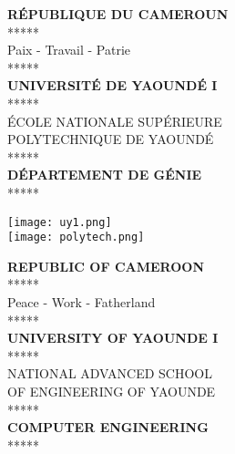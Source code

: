 \documentclass[12pt]{article}
\begin{document}
\thispagestyle{empty}

\begin{minipage}{0.3\linewidth}
    \begin{center}
        \textbf{RÉPUBLIQUE DU CAMEROUN}\\
        *****\\
        Paix - Travail - Patrie\\
        *****\\[0.3cm]

        \textbf{UNIVERSITÉ DE YAOUNDÉ I}\\
        *****\\[0.3cm]

        ÉCOLE NATIONALE SUPÉRIEURE\\
        POLYTECHNIQUE DE YAOUNDÉ\\
        *****\\[0.3cm]

        \textbf{DÉPARTEMENT DE GÉNIE}\\
        ***** 
    \end{center}
\end{minipage}
\begin{minipage}{0.35\linewidth}
    \begin{center}
        \texttt{[image: uy1.png]}\\[0.5cm]
        \texttt{[image: polytech.png]}
    \end{center}
\end{minipage}
\begin{minipage}{0.3\linewidth}
    \begin{center}
        \textbf{REPUBLIC OF CAMEROON}\\
        *****\\
        Peace - Work - Fatherland\\
        *****\\[0.3cm]

        \textbf{UNIVERSITY OF YAOUNDE I}\\
        *****\\[0.3cm]

        NATIONAL ADVANCED SCHOOL\\
        OF ENGINEERING OF YAOUNDE\\
        *****\\[0.3cm]

        \textbf{COMPUTER ENGINEERING}\\
        ***** 
    \end{center}
\end{minipage}
\end{document}
